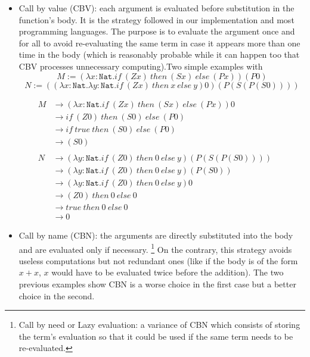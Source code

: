 \documentclass{article}
\newcounter{example}[section]
\begin{document}
    \begin{itemize}
        \item Call by value (CBV): each argument is evaluated before substitution in the function's body. It is the strategy followed in our implementation and most programming languages. The purpose is to evaluate the argument once and for all to avoid re-evaluating the same term in case it appears more than one time in the body (which is reasonably probable while it can happen too that CBV processes unnecessary computing).Two simple examples with 
        $$M :=  (\lambda x : \texttt{Nat}.if \ (Z x) \ then \ (S x) \ else \ (P x)) (P 0)$$
        $$N := ((\lambda x : \texttt{Nat}.\lambda y : \texttt{Nat}.if \ (Z x) \ then \ x \ else \ y ) 0) (P (S (P (S 0))))$$
    \end{itemize}
    \begin{align*}
            M &\rightarrow
            (\lambda x : \texttt{Nat}.if \ (Z x) \ then \ (S x) \ else \ (P x)) 0\\ &\rightarrow
            if \ (Z 0) \ then \ (S 0) \ else \ (P 0)\\ &\rightarrow
            if \ true \ then \ (S 0) \ else \ (P 0)\\ &\rightarrow
            (S 0)\\\\
            N &\rightarrow
           (\lambda y : \texttt{Nat}.if \ (Z 0) \ then \ 0 \ else \ y ) (P (S (P (S 0))))\\ &\rightarrow
           (\lambda y : \texttt{Nat}.if \ (Z 0) \ then \ 0 \ else \ y ) (P (S 0))\\ &\rightarrow
           (\lambda y : \texttt{Nat}.if \ (Z 0) \ then \ 0 \ else \ y ) 0\\ &\rightarrow
           (Z 0) \ then \ 0 \ else \ 0\\ &\rightarrow
           true \ then \ 0 \ else \ 0\\ &\rightarrow
           0
        \end{align*}
     \begin{itemize}
         \item Call by name (CBN): the arguments are directly substituted into the body and are evaluated only if necessary.
         \footnote{Call by need or Lazy evaluation: a variance of CBN which consists of storing the term's evaluation so that it could be used if the same term needs to be re-evaluated.}
         On the contrary, this strategy avoids useless computations but not redundant ones (like if the body is of the form $x+x$, $x$ would have to be evaluated twice before the addition). The two previous examples show CBN is a worse choice in the first case but a better choice in the second.
     \end{itemize}
\end{document}
